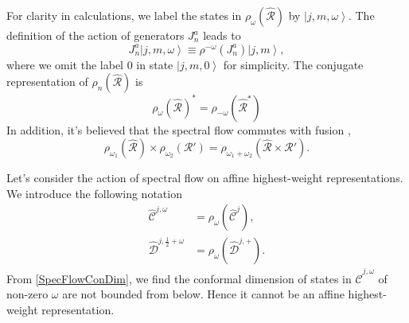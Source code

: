 \documentclass[10pt,a4paper]{article}
\numberwithin{equation}{section}
\newcommand{\ket}[1]{\left| #1 \right\rangle}
\begin{document}
For clarity in calculations, we label the states in $\rho_{\omega}\left(\hat{\mathcal{R}}\right)$ by $\ket{j,m,\omega}$. The definition 
of the action of generators $J^{a}_{n}$ leads to
\begin{equation}
    J^{a}_{n} \ket{j,m,\omega} \equiv \rho^{-\omega} \left(J^{a}_{n}\right) \ket{j,m},
\end{equation}
where we omit the label $0$ in state $\ket{j,m,0}$ for simplicity. 
The conjugate representation of $\rho_{n} \left(\hat{\mathcal{R}} \right)$ is 
\begin{equation}
    \rho_{\omega} \left( \hat{\mathcal{R}} \right)^{*} = \rho_{-\omega} \left(\hat{\mathcal{R}}^{*} \right)
\end{equation}
In addition, it's believed that the spectral flow commutes with fusion \cite{Gaberdiel:2001ny}, 
\begin{equation}
    \rho_{\omega_{1}} \left(\hat{\mathcal{R}}\right) \times \rho_{\omega_{2}} \left(\mathcal{R'}\right) = \rho_{\omega_{1} + \omega_{2}} \left(\hat{\mathcal{R}}\times \mathcal{R'}\right). \label{SpecFus}
\end{equation}

Let's consider the action of spectral flow on affine highest-weight representations. We introduce the following notation 
\begin{equation}
    \begin{aligned}
        \hat{\mathcal{C}}^{j,\omega} &= \rho_{\omega} \left( \hat{\mathcal{C}}^{j} \right),\\
        \hat{\mathcal{D}}^{j, \frac{1}{2} + \omega} &= \rho_{\omega} \left( \hat{\mathcal{D}}^{j, +} \right).
    \end{aligned}
\end{equation}
From \ref{SpecFlowConDim}, we find the conformal dimension of states in $\hat{\mathcal{C}}^{j,\omega}$ of non-zero $\omega$ are not bounded 
from below. Hence it cannot be an affine highest-weight representation.
\end{document}
